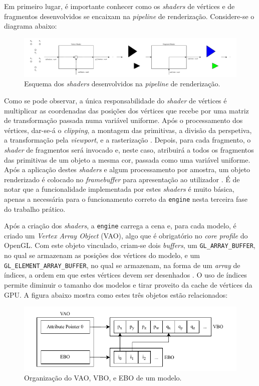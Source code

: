 \documentclass[12pt, a4paper]{article}
\begin{document}
Em primeiro lugar, é importante conhecer como os \emph{shaders} de vértices e de fragmentos
desenvolvidos se encaixam na \emph{pipeline} de renderização. Considere-se o diagrama abaixo:

\begin{figure}[H]
    \centering
    \includegraphics[width=\textwidth]{res/phase3/Shaders.pdf}
    \caption{Esquema dos \emph{shaders} desenvolvidos na \emph{pipeline} de renderização.}
\end{figure}

Como se pode observar, a única responsabilidade do \emph{shader} de vértices é multiplicar as
coordenadas das posições dos vértices que recebe por uma matriz de transformação passada numa
variável uniforme. Após o processamento dos vértices, dar-se-á o \emph{clipping}, a montagem das
primitivas, a divisão da perspetiva, a transformação pela \emph{viewport}, e a rasterização
\cite{vertex-post-processing}. Depois, para cada fragmento, o \emph{shader} de fragmentos será
invocado e, neste caso, atribuirá a todos os fragmentos das primitivas de um objeto a mesma cor,
passada como uma variável uniforme. Após a aplicação destes \emph{shaders} e algum processamento por
amostra, um objeto renderizado é colocado no \emph{framebuffer} para apresentação ao utilizador
\cite{per-sample-processing}. É de notar que a funcionalidade implementada por estes \emph{shaders}
é muito básica, apenas a necessária para o funcionamento correto da \texttt{engine} nesta terceira
fase do trabalho prático.

Após a criação dos \emph{shaders}, a \texttt{engine} carrega a cena e, para cada modelo, é criado um
\emph{Vertex Array Object} (VAO), algo que é obrigatório no \emph{core profile} do OpenGL. Com este
objeto vinculado, criam-se dois \emph{buffers}, um \texttt{GL\_ARRAY\_BUFFER}, no qual se armazenam
as posições dos vértices do modelo, e um \texttt{GL\_ELEMENT\_ARRAY\_BUFFER}, no qual se armazenam,
na forma de um \emph{array} de índices, a ordem em que estes vértices devem ser desenhados
\cite{glBufferData}. O uso de índices permite diminuir o tamanho dos modelos e tirar proveito da
cache de vértices da GPU. A figura abaixo mostra como estes três objetos estão relacionados:

\begin{figure}[H]
    \centering
    \includegraphics[width=\textwidth]{res/phase3/VAO.pdf}
    \caption{Organização do VAO, VBO, e EBO de um modelo.}
\end{figure}
\end{document}
